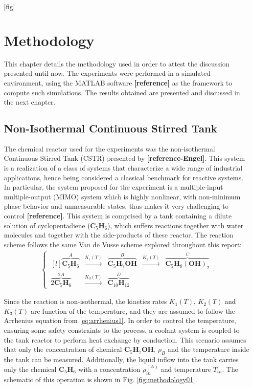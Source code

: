 \documentclass[a4paper,11pt]{book}
\numberwithin{figure}{chapter}
\numberwithin{equation}{chapter}
\numberwithin{table}{chapter}
\theoremstyle{definition}
\begin{document}
[fig]

\clearpage
\chapter{Methodology}

This chapter details the methodology used in order to attest the discussion presented until now. The experiments were performed in a simulated environment, using the MATLAB software \textbf{[reference]} as the framework to compute such simulations. The results obtained are presented and discussed in the next chapter.   

\section{Non-Isothermal Continuous Stirred Tank}

The chemical reactor used for the experiments was the non-isothermal Continuous Stirred Tank (CSTR) presented by \textbf{[reference-Engel]}. This system is a realization of a class of systems that characterize a wide range of industrial applications, hence being considered a classical benchmark for reactive systems. In particular, the system proposed for the experiment is a multiple-input multiple-output (MIMO) system which is highly nonlinear, with non-minimum phase behavior and unmeasurable states, thus makes it very challenging to control \textbf{[reference]}. This system is comprised by a tank containing a dilute solution of cyclopentadiene ($\textbf{C}_5 \textbf{H}_6$), which suffers reactions together with water molecules and together with the side-products of these reactor. The reaction scheme follows the same Van de Vusse scheme explored throughout this report:
\begin{align}
\left\{\ \begin{matrix*}[l]
	\overbrace{\textbf{C}_5 \textbf{H}_6}^{A} & \overset{K_1(T)}{\longrightarrow} & \overbrace{\textbf{C}_5 \textbf{H}_7 \textbf{OH}}^{B} & \overset{K_2(T)}{\longrightarrow} & \overbrace{\textbf{C}_5 \textbf{H}_8 (\textbf{OH})_2}^{C} \\ 
	\overbrace{2 \textbf{C}_5 \textbf{H}_6}^{2A} & \overset{K_3(T)}{\longrightarrow} & \overbrace{\textbf{C}_10 \textbf{H}_12}^{D}
\end{matrix*} \right.
.\end{align}

Since the reaction is non-isothermal, the kinetics rates $K_1(T)$, $K_2(T)$ and $K_3(T)$ are function of the temperature, and they are assumed to follow the Arrhenius equation from \eqref{eq:arrhenius1}. In order to control the temperature, ensuring some safety constraints to the process, a coolant system is coupled to the tank reactor to perform heat exchange by conduction. This scenario assumes that only the concentration of chemical $\textbf{C}_5 \textbf{H}_7 \textbf{OH}$, $\rho_B$ and the temperature inside the tank can be measured. Additionally, the liquid inflow into the tank carries only the chemical $\textbf{C}_5 \textbf{H}_6$ with a concentration $\rho^{(A)}_{in}$ and temperature $T_{in}$. The schematic of this operation is shown in Fig. \ref{fig:methodology01}. 
\end{document}
